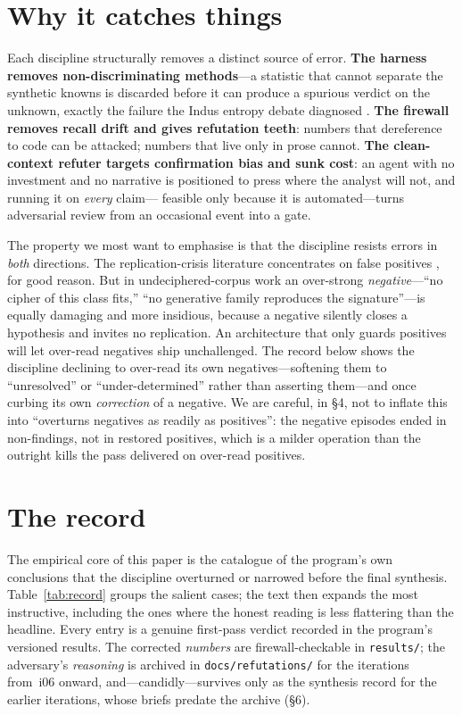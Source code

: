 \documentclass[11pt]{article}
\begin{document}
\section{Why it catches things}
Each discipline structurally removes a distinct source of error. \textbf{The harness removes
non-discriminating methods}---a statistic that cannot separate the synthetic knowns is
discarded before it can produce a spurious verdict on the unknown, exactly the failure the
Indus entropy debate diagnosed \citep{rao2009entropic,sproat2014statistical}. \textbf{The
firewall removes recall drift and gives refutation teeth}: numbers that dereference to code
can be attacked; numbers that live only in prose cannot. \textbf{The clean-context refuter
targets confirmation bias and sunk cost}: an agent with no investment and no narrative is
positioned to press where the analyst will not, and running it on \emph{every} claim---
feasible only because it is automated---turns adversarial review from an occasional event
into a gate.

The property we most want to emphasise is that the discipline resists errors in \emph{both}
directions. The replication-crisis literature concentrates on false positives
\citep{ioannidis2005why,simmons2011false}, for good reason. But in undeciphered-corpus work an
over-strong \emph{negative}---``no cipher of this class fits,'' ``no generative family
reproduces the signature''---is equally damaging and more insidious, because a negative
silently closes a hypothesis and invites no replication. An architecture that only guards
positives will let over-read negatives ship unchallenged. The record below shows the
discipline declining to over-read its own negatives---softening them to ``unresolved'' or
``under-determined'' rather than asserting them---and once curbing its own \emph{correction}
of a negative. We are careful, in \S4, not to inflate this into ``overturns negatives as
readily as positives'': the negative episodes ended in non-findings, not in restored
positives, which is a milder operation than the outright kills the pass delivered on
over-read positives.

\section{The record}
The empirical core of this paper is the catalogue of the program's own conclusions that the
discipline overturned or narrowed before the final synthesis. Table~\ref{tab:record} groups
the salient cases; the text then expands the most instructive, including the ones where the
honest reading is less flattering than the headline. Every entry is a genuine first-pass
verdict recorded in the program's versioned results. The corrected \emph{numbers} are
firewall-checkable in \texttt{results/}; the adversary's \emph{reasoning} is archived in
\texttt{docs/refutations/} for the iterations from~i06 onward, and---candidly---survives only
as the synthesis record for the earlier iterations, whose briefs predate the archive (\S6).
\end{document}
